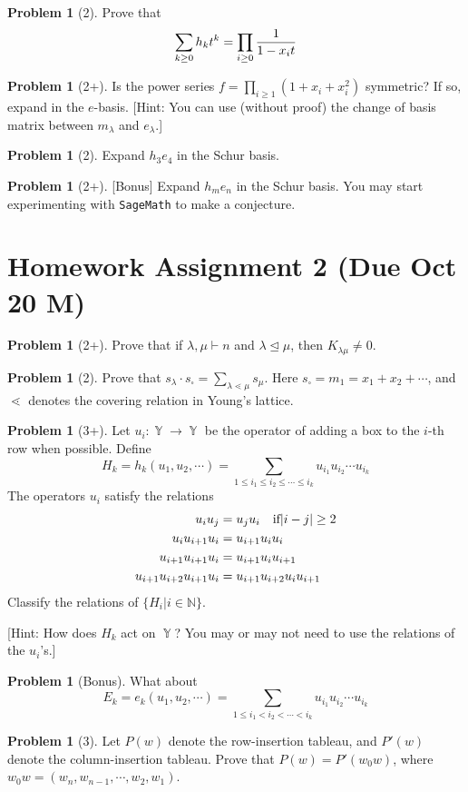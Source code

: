 \documentclass{amsart}
\theoremstyle{plain}
\theoremstyle{definition}
\newtheorem{problem}[theorem]{Problem}
\DeclareMathOperator{\YY}{\mathbb{Y}}
\begin{document}
	\begin{problem}[2]
		Prove that
		\[\sum_{k\geq 0} h_k t^k = \prod_{i\geq0}{1\over 1-x_it}\]
	\end{problem}
	
	\begin{problem}[2+]
		Is the power series $f=\prod_{i\geq 1}(1+x_i+x_i^2)$ symmetric? If so, expand in the $e$-basis. [Hint: You can use (without proof) the change of basis matrix between $m_\lambda$ and $e_\lambda$.]
	\end{problem}
		\begin{problem}[2]
		Expand $h_3e_4$ in the Schur basis. 	
	\end{problem}
	\begin{problem}[2+]
		[Bonus] Expand $h_me_n$ in the Schur basis. You may start experimenting with {\tt{SageMath}} to make a conjecture.
	\end{problem}
	
	
	\section{Homework Assignment 2 (Due Oct 20 M)}
	\begin{problem}[2+] 		Prove that if $\lambda,\mu\vdash n$ and $\lambda\trianglelefteq \mu$, then $K_{\lambda\mu}\neq 0$.
	\end{problem}
\begin{problem}[2]
	Prove that $s_\lambda\cdot s_{\square}=\sum_{\lambda \lessdot \mu}{s_\mu}$. Here $s_{\square}=m_1=x_1+x_2+\cdots$, and $\lessdot$ denotes the covering relation in Young's lattice.
\end{problem}

\begin{problem}[3+]
	Let $u_i:\YY\to \YY$ be the operator of adding a box to the $i$-th row when possible. Define 
	\[H_k=h_k(u_1,u_2,\cdots)=\sum_{1\leq i_1\leq i_2\leq\cdots\leq i_k}u_{i_1}u_{i_2}\cdots u_{i_k}\]
	The operators $u_i$ satisfy the relations 
	\begin{align*}
	u_iu_j&=u_ju_i\text{\quad if}|i-j|\geq 2\\
	u_iu_{i+1}u_i&=u_{i+1}u_iu_i\\
	u_{i+1}u_{i+1}u_i&=u_{i+1}u_iu_{i+1}\\
	u_{i+1}u_{i+2}u_{i+1}u_i&=u_{i+1}u_{i+2}u_iu_{i+1}	
	\end{align*}
	Classify the relations of $\{H_i|i\in\mathbb{N}\}$.
	
	
[Hint: How does $H_k$ act on $\YY$? You may or may not need to use the relations of the $u_i$'s.] 
\end{problem}
\begin{problem}[Bonus] What about 
	$$E_k=e_k(u_1,u_2,\cdots)=\sum_{1\leq i_1<i_2<\cdots<i_k}u_{i_1}u_{i_2}\cdots u_{i_k}$$
\end{problem}
\begin{problem}[3]
	Let $P(w)$ denote the row-insertion tableau, and $P'(w)$ denote the column-insertion tableau. Prove that $P(w)=P'(w_0w)$, where $w_0w=(w_n,w_{n-1},\cdots,w_2,w_1)$.
\end{problem}
\end{document}
